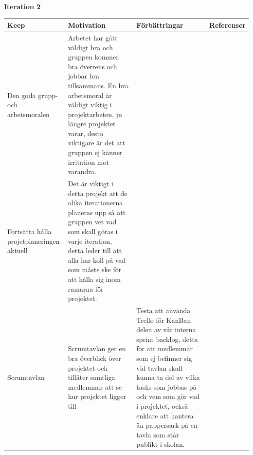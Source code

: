 \documentclass[conference,a4paper]{IEEEtran}
\newcommand\Tstrut{\rule{0pt}{2.6ex}}       %
\newcommand\Bstrut{\rule[-0.9ex]{0pt}{0pt}} %
\newcommand{\TBstrut}{\Tstrut\Bstrut} %
\begin{document}
\textbf{Iteration 2}


\begin{table}[H]
	\small
  \centering
	\begin{tabular}{|p{1.5cm}|p{2cm}|p{1.8cm}|p{1.5cm}|} %
    \hline
    Keep & Motivation & Förbättringar & Referenser \TBstrut \\
    \hline
    Den goda grupp- och arbetsmoralen & Arbetet har gått väldigt bra och gruppen kommer bra överrens och jobbar bra tillsammans. En bra arbetsmoral är väldigt viktig i projektarbeten, ju längre projektet varar, desto viktigare är det att gruppen ej känner irritation mot varandra. &  & \TBstrut \\
    \hline
    Fortsätta hålla projetplaneringen aktuell & Det är viktigt i detta projekt att de olika iterationerna planeras upp så att gruppen vet vad som skall göras i varje iteration, detta leder till att alla har koll på vad som måste ske för att hålla sig inom ramarna för projektet. & & \TBstrut \\
    \hline
    Scrumtavlan & Scrumtavlan ger en bra överblick över projektet och tillåter samtliga medlemmar att se hur projektet ligger till & Testa att använda Trello för KanBan delen av vår interna sprint backlog, detta för att medlemmar som ej befinner sig vid tavlan skall kunna ta del av vilka tasks som jobbas på och vem som gör vad i projektet, också enklare att hantera än pappersark på en tavla som står publikt i skolan. & \TBstrut \\
    \hline
  \end{tabular}
\end{table}
\end{document}

